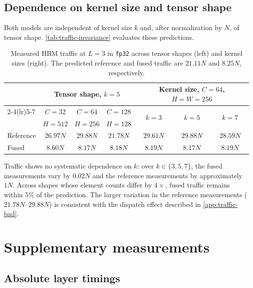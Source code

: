 \documentclass[10pt]{article} %
\theoremstyle{plain}
\begin{document}
\subsection{Dependence on kernel size and tensor shape}
\label{app:traffic-invariance}

Both models are independent of kernel size $k$ and, after normalization by $N$,
of tensor shape. \autoref{tab:traffic-invariance} evaluates these predictions.

\begin{table}[h]
\centering
\caption{Measured HBM traffic at $L{=}3$ in \texttt{fp32} across tensor shapes
(left) and kernel sizes (right). The predicted reference and fused traffic are
$21.11N$ and $8.25N$, respectively.}
\label{tab:traffic-invariance}
\begin{tabular}{lcccccc}
\toprule
& \multicolumn{3}{c}{Tensor shape, $k{=}5$} & \multicolumn{3}{c}{Kernel size, $C{=}64$, $H{=}W{=}256$}\\
\cmidrule(lr){2-4}\cmidrule(lr){5-7}
& $C{=}32$  & $C{=}64$  & $C{=}128$ & \multirow{2}{*}{$k{=}3$} & \multirow{2}{*}{$k{=}5$} & \multirow{2}{*}{$k{=}7$} \\
& $H{=}512$ & $H{=}256$ & $H{=}128$ & & & \\
\midrule
Reference & $26.97N$ & $29.88N$ & $21.78N$ & $29.61N$ & $29.88N$ & $28.59N$ \\
Fused     & $8.60N$  & $8.17N$  & $8.18N$  & $8.19N$  & $8.17N$  & $8.19N$ \\
\bottomrule
\end{tabular}
\end{table}

Traffic shows no systematic dependence on $k$: over $k\in\{3,5,7\}$, the fused
measurements vary by $0.02N$ and the reference measurements by approximately
$1N$. Across shapes whose element counts differ by $4\times$, fused traffic
remains within $5\%$ of the prediction. The larger variation in the reference
measurements ($21.78N$--$29.88N$) is consistent with the dispatch effect
described in \autoref{app:traffic-bad}.

\clearpage

\section{Supplementary measurements}
\label{app:extra}

\subsection{Absolute layer timings}
\end{document}
